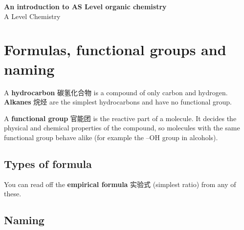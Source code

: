 \documentclass[11pt]{article}
\begin{document}
\begin{center}
  {\LARGE\bfseries An introduction to AS Level organic chemistry}\\[0.35em]
  {\large A Level Chemistry}
\end{center}
\vspace{0.6em}

\section*{Formulas, functional groups and naming}

A \textbf{hydrocarbon} 碳氢化合物 is a compound of only carbon and hydrogen. \textbf{Alkanes} 烷烃 are the simplest hydrocarbons and have no functional group.

A \textbf{functional group} 官能团 is the reactive part of a molecule. It decides the physical and chemical properties of the compound, so molecules with the same functional group behave alike (for example the $\text{–OH}$ group in alcohols).

\subsection*{Types of formula}

\begin{center}
\end{center}

You can read off the \textbf{empirical formula} 实验式 (simplest ratio) from any of these.

\subsection*{Naming}
\end{document}
